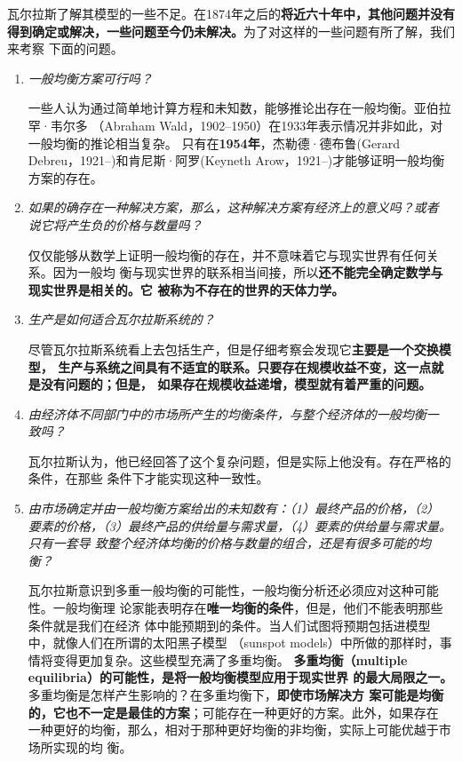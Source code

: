 瓦尔拉斯了解其模型的一些不足。在1874年之后的\textbf{将近六十年中，其他问题并没有
得到确定或解决，一些问题至今仍未解决。}为了对这样的一些问题有所了解，我们来考察
下面的问题。
\begin{enumerate}
\item \textit{一般均衡方案可行吗？}

  一些人认为通过简单地计算方程和未知数，能够推论出存在一般均衡。亚伯拉罕·韦尔多
（Abraham Wald，1902--1950）在1933年表示情况并非如此，对一般均衡的推论相当复杂。
只有在\textbf{1954年}，杰勒德·德布鲁(Gerard Debreu，1921--)和肯尼斯·阿罗(Keyneth
Arow，1921--)才能够证明一般均衡方案的存在。

\item \textit{如果的确存在一种解决方案，那么，这种解决方案有经济上的意义吗？或者
说它将产生负的价格与数量吗？}

仅仅能够从数学上证明一般均衡的存在，并不意味着它与现实世界有任何关系。因为一般均
衡与现实世界的联系相当间接，所以\textbf{还不能完全确定数学与现实世界是相关的。它
被称为不存在的世界的天体力学。}

\item \textit{生产是如何适合瓦尔拉斯系统的？}

  尽管瓦尔拉斯系统看上去包括生产，但是仔细考察会发现它\textbf{主要是一个交换模型，
生产与系统之间具有不适宜的联系。只要存在规模收益不变，这一点就是没有问题的；但是，
如果存在规模收益递增，模型就有着严重的问题。}

\item \textit{由经济体不同部门中的市场所产生的均衡条件，与整个经济体的一般均衡一
致吗？}

瓦尔拉斯认为，他已经回答了这个复杂问题，但是实际上他没有。存在严格的条件，在那些
条件下才能实现这种一致性。

\item \textit{由市场确定并由一般均衡方案给出的未知数有：（1）最终产品的价格，（2）
要素的价格，（3）最终产品的供给量与需求量，（4）要素的供给量与需求量。只有一套导
致整个经济体均衡的价格与数量的组合，还是有很多可能的均衡？}

瓦尔拉斯意识到多重一般均衡的可能性，一般均衡分析还必须应对这种可能性。一般均衡理
论家能表明存在\textbf{唯一均衡的条件}，但是，他们不能表明那些条件就是我们在经济
体中能预期到的条件。当人们试图将预期包括进模型中，就像人们在所谓的太阳黑子模型
（sunspot models）中所做的那样时，事情将变得更加复杂。这些模型充满了多重均衡。
\textbf{多重均衡（multiple equilibria）的可能性，是将一般均衡模型应用于现实世界
的最大局限之一。}多重均衡是怎样产生影响的？在多重均衡下，\textbf{即使市场解决方
案可能是均衡的，它也不一定是最佳的方案}；可能存在一种更好的方案。此外，如果存在
一种更好的均衡，那么，相对于那种更好均衡的非均衡，实际上可能优越于市场所实现的均
衡。


\end{enumerate}
